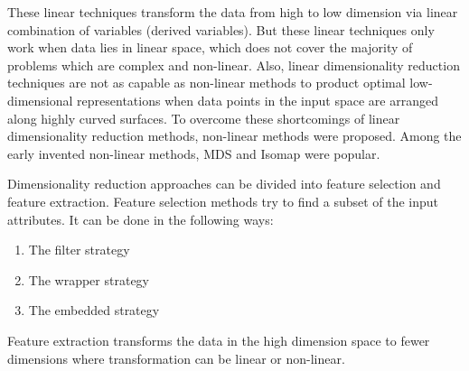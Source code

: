 \documentclass[letterpaper, 10 pt, conference]{ieeeconf}  %
\begin{document}
These linear techniques transform the data from high to low dimension via linear combination of variables
(derived variables). But these linear techniques only work when data lies in linear space, which does not cover
the majority of problems which are complex and non-linear. Also, linear dimensionality reduction techniques
are not as capable as non-linear methods to product optimal low-dimensional representations when data
points in the input space are arranged along highly curved surfaces. To overcome these shortcomings of
linear dimensionality reduction methods, non-linear methods were proposed. Among the early invented non-linear methods, MDS and Isomap were popular.

Dimensionality reduction approaches can be divided into feature selection and feature extraction. Feature selection methods try to find a subset of the input attributes. It can be done in the following ways:

\begin{enumerate}
	\item The filter strategy
	\item The wrapper strategy
	\item The embedded strategy
\end{enumerate}

Feature extraction transforms the data in the high dimension space to fewer dimensions where transformation can be linear or non-linear.
\end{document}
